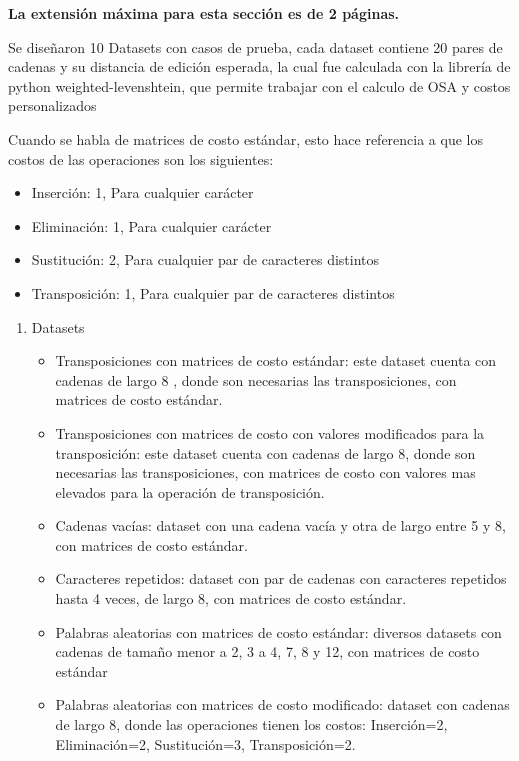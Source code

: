 \begin{mdframed}
    \textbf{La extensión máxima para esta sección es de 2 páginas.}
\end{mdframed}

Se diseñaron 10 Datasets con casos de prueba, cada dataset contiene 20
pares de cadenas y su distancia de edición esperada, la cual fue calculada
con la librería de python weighted-levenshtein, que permite trabajar con 
el calculo de OSA y costos personalizados

\begin{mdframed}
    Cuando se habla de matrices de costo estándar, esto hace referencia a que 
    los costos de las operaciones son los siguientes:
    \begin{itemize}
        \item Inserción: 1, Para cualquier carácter
        \item Eliminación: 1, Para cualquier carácter
        \item Sustitución: 2, Para cualquier par de caracteres distintos
        \item Transposición: 1, Para cualquier par de caracteres distintos 
    \end{itemize}
\end{mdframed}    

\begin{enumerate}
    \item Datasets
        \begin{itemize}
            \item Transposiciones con matrices de costo estándar: este dataset cuenta con cadenas de largo 8
            , donde son necesarias las transposiciones, con matrices
            de costo estándar.
            \item Transposiciones con matrices de costo con valores modificados para la transposición: este
            dataset cuenta con cadenas de largo 8, donde son necesarias las transposiciones,
            con matrices de costo con valores mas elevados para la operación de transposición.
            \item Cadenas vacías: dataset con una cadena vacía y otra de largo entre 5 y 8, con
            matrices de costo estándar.
            \item Caracteres repetidos: dataset con par de cadenas con caracteres repetidos
            hasta 4 veces, de largo 8, con matrices de costo estándar.
            \item Palabras aleatorias con matrices de costo estándar: diversos datasets con cadenas de tamaño
                menor a 2, 3 a 4, 7, 8 y 12, con matrices de costo estándar
            \item Palabras aleatorias con matrices de costo modificado: dataset con
            cadenas de largo 8, donde las operaciones tienen los costos: Inserción=2,
            Eliminación=2, Sustitución=3, Transposición=2.
        \end{itemize}

\end{enumerate}


